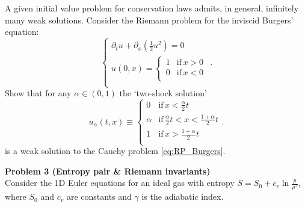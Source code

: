 \documentclass[letter,11pt]{article}
\begin{document}
\noindent A given initial value problem for conservation laws admits, in general, infinitely many weak solutions. Consider the Riemann problem for the inviscid Burgers' equation:
\begin{equation}
  \left\{ \begin{array}{l}
  \partial_t u + \partial_x\left(\frac{1}{2}u^2\right) = 0 \\
  u(0,x) = \left\{ \begin{array}{cc}
  1 & \mathrm{if}\, x>0 \\
  0 & \mathrm{if}\, x<0 \\
  \end{array}\right.\\
  \end{array}\right.. \label{eq:RP_Burgers}
  \end{equation}
Show that for any $\alpha\in(0,1)$ the `two-shock solution'
\begin{equation}
  u_\alpha(t,x) \equiv \left\{ \begin{array}{ll}
    0 & \mathrm{if}\, x< \frac{\alpha}{2}t \\
    \alpha & \mathrm{if}\, \frac{\alpha}{2}t<x<\frac{1+\alpha}{2}t \\
    1 & \mathrm{if}\, x>\frac{1+\alpha}{2}t \\
  \end{array}\right. .
\end{equation}
is a weak solution to the Cauchy problem \eqref{eq:RP_Burgers}.


\newpage
\phantom{.}

{\noindent\large\textbf{Problem 3 (Entropy pair \& Riemann invariants)}}\\

\noindent Consider the 1D Euler equations for an ideal gas with entropy $S = S_0 + c_v\ln\frac{p}{\rho^\gamma}$, where $S_0$ and $c_v$ are constants and $\gamma$ is the adiabatic index.
\end{document}
